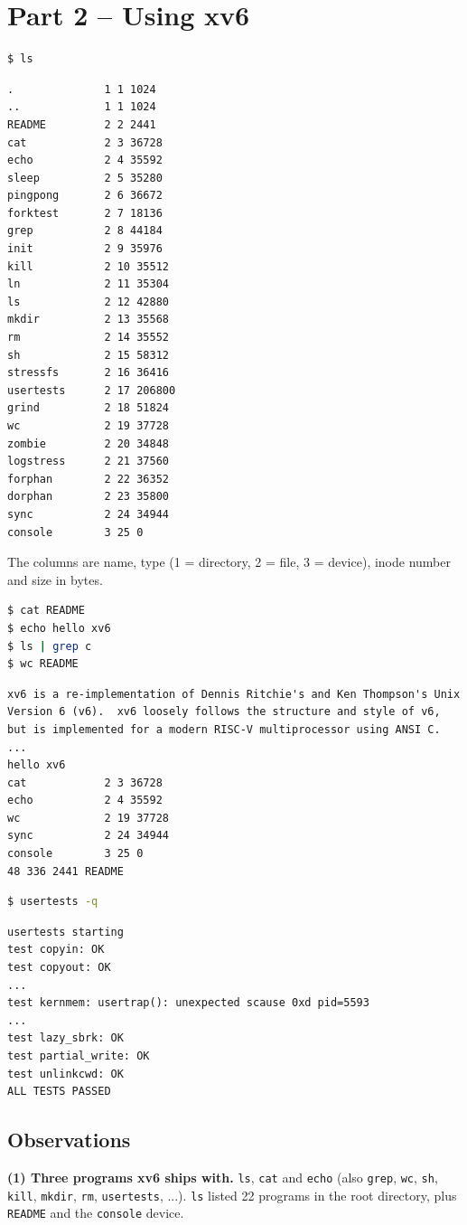 \documentclass[12pt]{article}
\begin{document}
\section*{Part 2 -- Using xv6}
\begin{lstlisting}[language=bash]
$ ls
\end{lstlisting}
\begin{lstlisting}
.              1 1 1024
..             1 1 1024
README         2 2 2441
cat            2 3 36728
echo           2 4 35592
sleep          2 5 35280
pingpong       2 6 36672
forktest       2 7 18136
grep           2 8 44184
init           2 9 35976
kill           2 10 35512
ln             2 11 35304
ls             2 12 42880
mkdir          2 13 35568
rm             2 14 35552
sh             2 15 58312
stressfs       2 16 36416
usertests      2 17 206800
grind          2 18 51824
wc             2 19 37728
zombie         2 20 34848
logstress      2 21 37560
forphan        2 22 36352
dorphan        2 23 35800
sync           2 24 34944
console        3 25 0
\end{lstlisting}
The columns are name, type (1 = directory, 2 = file, 3 = device), inode number and size in bytes.

\begin{lstlisting}[language=bash]
$ cat README
$ echo hello xv6
$ ls | grep c
$ wc README
\end{lstlisting}
\begin{lstlisting}
xv6 is a re-implementation of Dennis Ritchie's and Ken Thompson's Unix
Version 6 (v6).  xv6 loosely follows the structure and style of v6,
but is implemented for a modern RISC-V multiprocessor using ANSI C.
...
hello xv6
cat            2 3 36728
echo           2 4 35592
wc             2 19 37728
sync           2 24 34944
console        3 25 0
48 336 2441 README
\end{lstlisting}

\begin{lstlisting}[language=bash]
$ usertests -q
\end{lstlisting}
\begin{lstlisting}
usertests starting
test copyin: OK
test copyout: OK
...
test kernmem: usertrap(): unexpected scause 0xd pid=5593
...
test lazy_sbrk: OK
test partial_write: OK
test unlinkcwd: OK
ALL TESTS PASSED
\end{lstlisting}

\subsection*{Observations}
\textbf{(1) Three programs xv6 ships with.} \texttt{ls}, \texttt{cat} and \texttt{echo} (also \texttt{grep}, \texttt{wc}, \texttt{sh}, \texttt{kill}, \texttt{mkdir}, \texttt{rm}, \texttt{usertests}, ...). \texttt{ls} listed 22 programs in the root directory, plus \texttt{README} and the \texttt{console} device.
\end{document}
